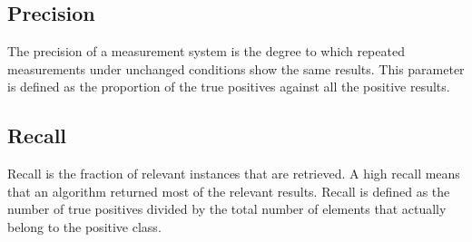 \documentclass[english, a4paper, 12pt]{article}
\newcommand{\tab}{\hspace*{2em}}
\begin{document}
\subsection{Precision}
\tab The precision of a measurement system is the degree to which repeated measurements under unchanged conditions show the same results. This parameter is defined as the proportion of the true positives against all the positive results.
\subsection{Recall}
\tab Recall is the fraction of relevant instances that are retrieved. A high recall means that an algorithm returned most of the relevant results. Recall is defined as the number of true positives divided by the total number of elements that actually belong to the positive class.
\end{document}
